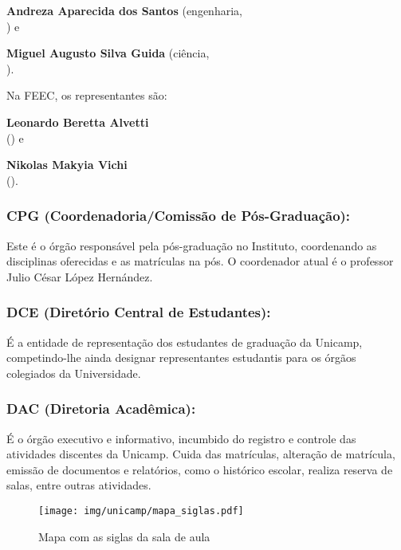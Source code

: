 \begin{compactitemize}
\item \textbf{Andreza Aparecida dos Santos} (engenharia,
  \\ ) e
\item \textbf{Miguel Augusto Silva Guida} (ciência,
  \\ ).
\end{compactitemize}

Na FEEC, os representantes são:

\begin{compactitemize}
\item \textbf{Leonardo Beretta Alvetti}
  \\ () e
\item \textbf{Nikolas Makyia Vichi}
  \\ ().
\end{compactitemize}

\subsubsection{CPG (Coordenadoria/Comissão de Pós-Graduação):} Este é o órgão
responsável pela pós-graduação no Instituto, coordenando as disciplinas
oferecidas e as matrículas na pós. O coordenador atual é o professor Julio
César López Hernández.

\subsubsection{DCE (Diretório Central de Estudantes):} É a entidade de
representação dos estudantes de graduação da Unicamp, competindo-lhe ainda
designar representantes estudantis para os órgãos colegiados da Universidade.

\subsubsection{DAC (Diretoria Acadêmica):} É o órgão executivo e informativo,
incumbido do registro e controle das atividades discentes da Unicamp. Cuida das
matrículas, alteração de matrícula, emissão de documentos e relatórios, como o
histórico escolar, realiza reserva de salas, entre outras atividades.

\begin{figure*}[hb!]
  \centering
  \texttt{[image: img/unicamp/mapa\_siglas.pdf]}
  \caption{Mapa com as siglas da sala de aula}
  \label{fig:mapa_siglas}
\end{figure*}

